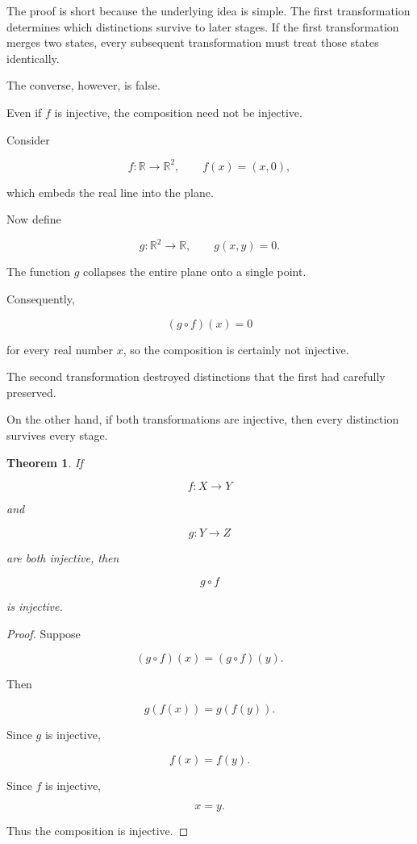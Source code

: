 \documentclass[11pt]{book}
\numberwithin{equation}{chapter}
\theoremstyle{definition}
\theoremstyle{plain}
\newtheorem{theorem}[definition]{Theorem}
\theoremstyle{remark}
\begin{document}
The proof is short because the underlying idea is simple. The first transformation determines which distinctions survive to later stages. If the first transformation merges two states, every subsequent transformation must treat those states identically.

The converse, however, is false.

Even if \(f\) is injective, the composition need not be injective.

Consider

\[
f:\mathbb{R}\rightarrow\mathbb{R}^{2},
\qquad
f(x)=(x,0),
\]

which embeds the real line into the plane.

Now define

\[
g:\mathbb{R}^{2}\rightarrow\mathbb{R},
\qquad
g(x,y)=0.
\]

The function \(g\) collapses the entire plane onto a single point.

Consequently,

\[
(g\circ f)(x)=0
\]

for every real number \(x\), so the composition is certainly not injective.

The second transformation destroyed distinctions that the first had carefully preserved.

On the other hand, if both transformations are injective, then every distinction survives every stage.

\begin{theorem}
If

\[
f:X\rightarrow Y
\]

and

\[
g:Y\rightarrow Z
\]

are both injective, then

\[
g\circ f
\]

is injective.
\end{theorem}

\begin{proof}
Suppose

\[
(g\circ f)(x)
=
(g\circ f)(y).
\]

Then

\[
g(f(x))
=
g(f(y)).
\]

Since \(g\) is injective,

\[
f(x)=f(y).
\]

Since \(f\) is injective,

\[
x=y.
\]

Thus the composition is injective.
\end{proof}
\end{document}
